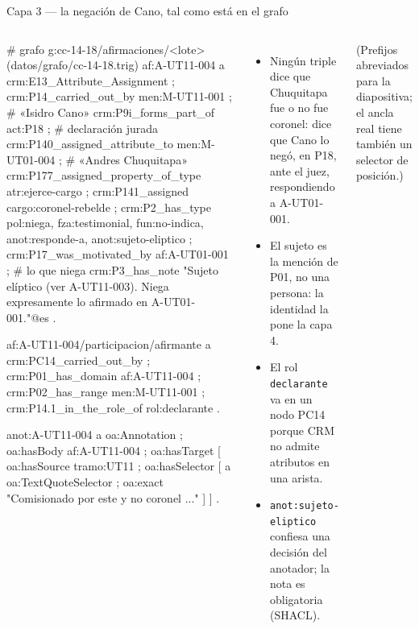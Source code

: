 \documentclass[aspectratio=169,10pt]{beamer}
\newcommand{\ttt}[1]{\texttt{\small #1}}
\begin{document}
\begin{frame}[fragile]{Capa 3 — la negación de Cano, tal como está en el grafo}
\begin{columns}[T]
\tiny
\begin{semiverbatim}
# grafo g:cc-14-18/afirmaciones/<lote>  (datos/grafo/cc-14-18.trig)
af:A-UT11-004 a crm:E13_Attribute_Assignment ;
  crm:P14_carried_out_by  men:M-UT11-001 ;     # «Isidro Cano»
  crm:P9i_forms_part_of   act:P18 ;            # declaración jurada
  crm:P140_assigned_attribute_to men:M-UT01-004 ; # «Andres Chuquitapa»
  crm:P177_assigned_property_of_type atr:ejerce-cargo ;
  crm:P141_assigned       cargo:coronel-rebelde ;
  crm:P2_has_type pol:niega, fza:testimonial, fun:no-indica,
                  anot:responde-a, anot:sujeto-eliptico ;
  crm:P17_was_motivated_by af:A-UT01-001 ;     # lo que niega
  crm:P3_has_note "Sujeto elíptico (ver A-UT11-003).
     Niega expresamente lo afirmado en A-UT01-001."@es .

af:A-UT11-004/participacion/afirmante a crm:PC14_carried_out_by ;
  crm:P01_has_domain af:A-UT11-004 ;
  crm:P02_has_range  men:M-UT11-001 ;
  crm:P14.1_in_the_role_of rol:declarante .

anot:A-UT11-004 a oa:Annotation ;
  oa:hasBody af:A-UT11-004 ;
  oa:hasTarget [ oa:hasSource tramo:UT11 ;
    oa:hasSelector [ a oa:TextQuoteSelector ;
      oa:exact "Comisionado por este y no coronel ..." ] ] .
\end{semiverbatim}
\footnotesize
\begin{itemize}
\item Ningún triple dice que Chuquitapa fue o no fue coronel: dice que \alert{Cano lo negó}, en P18, ante el
      juez, respondiendo a A-UT01-001.
\item El sujeto es la \alert{mención} de P01, no una persona: la identidad la pone la capa 4.
\item El rol \ttt{declarante} va en un nodo PC14 porque CRM no admite atributos en una arista.
\item \ttt{anot:sujeto-eliptico} confiesa una decisión del anotador; la nota es obligatoria (SHACL).
\end{itemize}
\scriptsize (Prefijos abreviados para la diapositiva; el ancla real tiene también un selector de posición.)
\end{columns}
\end{frame}
\end{document}
